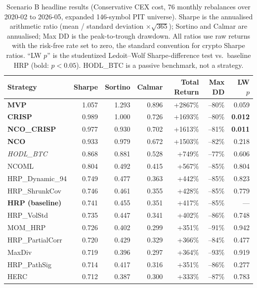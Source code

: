 \documentclass[11pt,a4paper]{article}
\begin{document}
\begin{table}[H]
\centering\footnotesize
\caption{Scenario B headline results (Conservative CEX cost, 76 monthly
rebalances over 2020-02 to 2026-05, expanded 146-symbol PIT universe).
Sharpe is the annualised arithmetic ratio (mean / standard deviation
$\times\sqrt{365}$); Sortino and Calmar are annualised; Max DD is the
peak-to-trough drawdown. All ratios use raw returns with the
risk-free rate set to zero, the standard convention for crypto Sharpe
ratios. ``LW $p$'' is the studentized Ledoit--Wolf
Sharpe-difference test vs.\ baseline HRP (bold: $p<0.05$). HODL\_BTC is
a passive benchmark, not a strategy.}
\label{tab:scenarioB}
\begin{tabular}{lrrrrrr}
\toprule
Strategy & Sharpe & Sortino & Calmar & Total Return & Max DD & LW $p$\\
\midrule
\textbf{MVP}             & 1.057 & 1.293 & 0.896 & +2867\% & --80\% & 0.059\\
\textbf{CRISP}           & 0.989 & 1.000 & 0.726 & +1693\% & --80\% & \textbf{0.012}\\
\textbf{NCO\_CRISP}      & 0.977 & 0.930 & 0.702 & +1613\% & --81\% & \textbf{0.011}\\
\textbf{NCO}             & 0.933 & 0.979 & 0.672 & +1503\% & --82\% & 0.218\\
\textit{HODL\_BTC}       & 0.868 & 0.881 & 0.528 & +749\%  & --77\% & 0.606\\
NCOML                    & 0.804 & 0.492 & 0.415 & +567\%  & --85\% & 0.804\\
HRP\_Dynamic\_94         & 0.749 & 0.477 & 0.363 & +442\%  & --85\% & 0.823\\
HRP\_ShrunkCov           & 0.746 & 0.461 & 0.355 & +428\%  & --85\% & 0.779\\
\textbf{HRP (baseline)}  & 0.741 & 0.455 & 0.351 & +417\%  & --85\% & ---\\
HRP\_VolStd              & 0.735 & 0.447 & 0.341 & +402\%  & --86\% & 0.748\\
MOM\_HRP                 & 0.726 & 0.402 & 0.299 & +351\%  & --91\% & 0.942\\
HRP\_PartialCorr         & 0.720 & 0.429 & 0.329 & +366\%  & --84\% & 0.477\\
MaxDiv                   & 0.719 & 0.396 & 0.297 & +364\%  & --93\% & 0.919\\
HRP\_PathSig             & 0.714 & 0.417 & 0.316 & +351\%  & --86\% & 0.277\\
HERC                     & 0.712 & 0.387 & 0.300 & +333\%  & --87\% & 0.783\\

\end{tabular}
\end{table}
\end{document}
